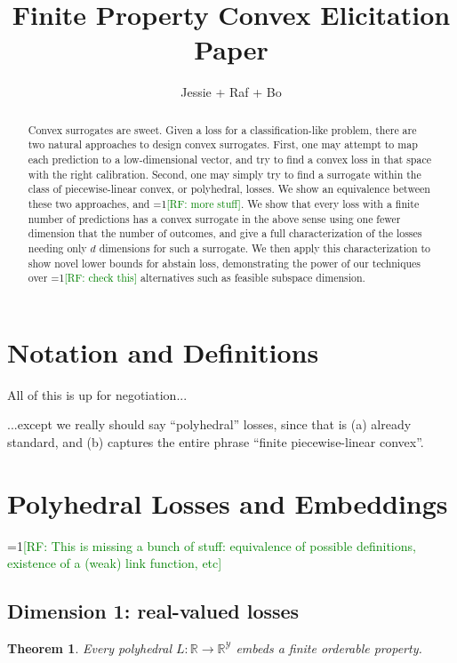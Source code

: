 \documentclass[11pt]{article}
\title{Finite Property Convex Elicitation Paper}
\author{Jessie + Raf + Bo}
\newcommand{\Comments}{1}
\newcommand{\mynote}[2]{\ifnum\Comments=1\textcolor{#1}{#2}\fi}
\newcommand{\raf}[1]{\mynote{green}{[RF: #1]}}
\newcommand{\reals}{\mathbb{R}}
\newcommand{\Y}{\mathcal{Y}}
\newtheorem{theorem}{Theorem}
\begin{document}
\maketitle

\begin{abstract}
  Convex surrogates are sweet.
  Given a loss for a classification-like problem, there are two natural approaches to design convex surrogates.
  First, one may attempt to map each prediction to a low-dimensional vector, and try to find a convex loss in that space with the right calibration.
  Second, one may simply try to find a surrogate within the class of piecewise-linear convex, or polyhedral, losses.
  We show an equivalence between these two approaches, and \raf{more stuff}.
  We show that every loss with a finite number of predictions has a convex surrogate in the above sense using one fewer dimension that the number of outcomes, and give a full characterization of the losses needing only $d$ dimensions for such a surrogate.
  We then apply this characterization to show novel lower bounds for abstain loss, demonstrating the power of our techniques over \raf{check this} alternatives such as feasible subspace dimension.
\end{abstract}

\section{Notation and Definitions}

All of this is up for negotiation...

...except we really should say ``polyhedral'' losses, since that is (a) already standard, and (b) captures the entire phrase ``finite piecewise-linear convex''.

\section{Polyhedral Losses and Embeddings}

\raf{This is missing a bunch of stuff: equivalence of possible definitions, existence of a (weak) link function, etc}

\subsection{Dimension 1: real-valued losses}

\begin{theorem}
  Every polyhedral $L : \reals \to \reals^\Y$ embeds a finite orderable property.
\end{theorem}
\end{document}
